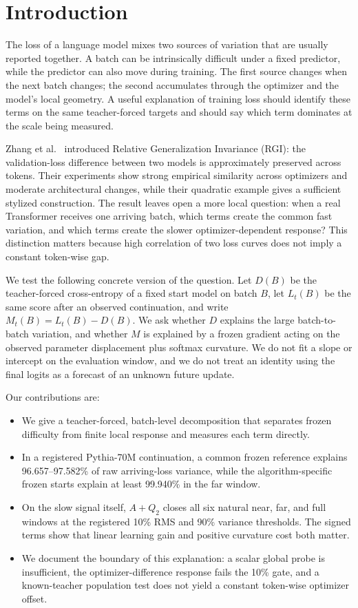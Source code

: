 \section{Introduction}

The loss of a language model mixes two sources of variation that are usually reported together.  A batch can be intrinsically difficult under a fixed predictor, while the predictor can also move during training.  The first source changes when the next batch changes; the second accumulates through the optimizer and the model's local geometry.  A useful explanation of training loss should identify these terms on the same teacher-forced targets and should say which term dominates at the scale being measured.

Zhang et al.~\citep{zhang2026relativegeneralizationinvariancellm} introduced Relative Generalization Invariance (RGI): the validation-loss difference between two models is approximately preserved across tokens.  Their experiments show strong empirical similarity across optimizers and moderate architectural changes, while their quadratic example gives a sufficient stylized construction.  The result leaves open a more local question: when a real Transformer receives one arriving batch, which terms create the common fast variation, and which terms create the slower optimizer-dependent response?  This distinction matters because high correlation of two loss curves does not imply a constant token-wise gap.

We test the following concrete version of the question.  Let \(D(B)\) be the teacher-forced cross-entropy of a fixed start model on batch \(B\), let \(L_t(B)\) be the same score after an observed continuation, and write \(M_t(B)=L_t(B)-D(B)\).  We ask whether \(D\) explains the large batch-to-batch variation, and whether \(M\) is explained by a frozen gradient acting on the observed parameter displacement plus softmax curvature.  We do not fit a slope or intercept on the evaluation window, and we do not treat an identity using the final logits as a forecast of an unknown future update.

Our contributions are:
\begin{itemize}
  \item We give a teacher-forced, batch-level decomposition that separates frozen difficulty from finite local response and measures each term directly.
  \item In a registered Pythia-70M continuation, a common frozen reference explains 96.657--97.582\% of raw arriving-loss variance, while the algorithm-specific frozen starts explain at least 99.940\% in the far window.
  \item On the slow signal itself, \(A+Q_2\) closes all six natural near, far, and full windows at the registered 10\% RMS and 90\% variance thresholds.  The signed terms show that linear learning gain and positive curvature cost both matter.
  \item We document the boundary of this explanation: a scalar global probe is insufficient, the optimizer-difference response fails the 10\% gate, and a known-teacher population test does not yield a constant token-wise optimizer offset.
\end{itemize}

